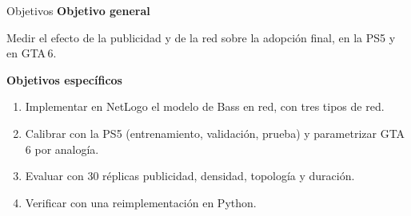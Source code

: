 \documentclass[aspectratio=169,11pt,notes=only]{beamer}
\begin{document}
\begin{frame}{Objetivos}
  \vskip2mm
  {\bfseries Objetivo general}\par\vskip1mm Medir el efecto de la publicidad y de la red sobre la adopción final, en la PS5 y en GTA\,6.\par\vskip5mm
  {\bfseries Objetivos específicos}\par\vskip1mm
  \begin{enumerate}
    \item Implementar en NetLogo el modelo de Bass en red, con tres tipos de red.
    \item Calibrar con la PS5 (entrenamiento, validación, prueba) y parametrizar GTA\,6 por analogía.
    \item Evaluar con 30 réplicas publicidad, densidad, topología y duración.
    \item Verificar con una reimplementación en Python.
  \end{enumerate}
\end{frame}
\end{document}
